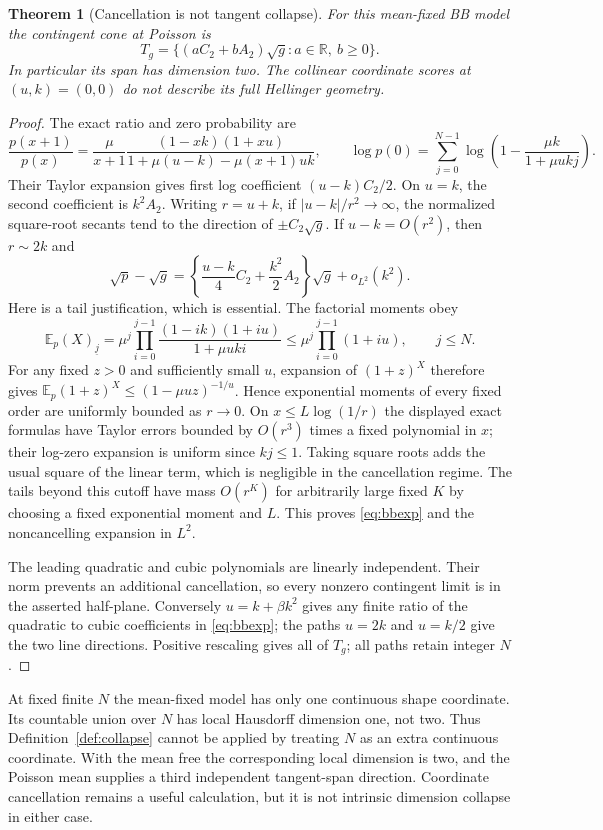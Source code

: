 \documentclass[11pt]{article}
\newcommand{\E}{\mathbb E}
\newtheorem{theorem}{Theorem}
\theoremstyle{definition}
\theoremstyle{remark}
\begin{document}
\begin{theorem}[Cancellation is not tangent collapse]\label{th:bb}
For this mean-fixed BB model the contingent cone at Poisson is
\[
 T_g=\{(a C_2+b A_2)\sqrt g:a\in\mathbb R,\ b\ge0\}.
\]
In particular its span has dimension two. The collinear coordinate scores
at $(u,k)=(0,0)$ do not describe its full Hellinger geometry.
\end{theorem}
\begin{proof}
The exact ratio and zero probability are
\[
 \frac{p(x+1)}{p(x)}=\frac{\mu}{x+1}
 \frac{(1-xk)(1+xu)}{1+\mu(u-k)-\mu(x+1)uk},\qquad
 \log p(0)=\sum_{j=0}^{N-1}\log\left(1-\frac{\mu k}{1+\mu ukj}\right).
\]
Their Taylor expansion gives first log coefficient $(u-k)C_2/2$.
On $u=k$, the second coefficient is $k^2 A_2$.
Writing $r=u+k$, if $|u-k|/r^2\to\infty$, the normalized square-root
secants tend to the direction of $\pm C_2\sqrt g$. If $u-k=O(r^2)$,
then $r\sim2k$ and
\begin{equation}\label{eq:bbexp}
 \sqrt p-\sqrt g=
 \left\{\frac{u-k}{4}C_2+\frac{k^2}{2}A_2\right\}\sqrt g+o_{L^2}(k^2).
\end{equation}
Here is a tail justification, which is essential. The factorial moments obey
\[
 \E_p(X)_{\underline j}
 =\mu^j\prod_{i=0}^{j-1}\frac{(1-ik)(1+iu)}{1+\mu uki}
 \le\mu^j\prod_{i=0}^{j-1}(1+iu),\qquad j\le N.
\]
For any fixed $z>0$ and sufficiently small $u$, expansion of
$(1+z)^X$ therefore gives
$\E_p(1+z)^X\le(1-\mu uz)^{-1/u}$. Hence exponential moments of every
fixed order are uniformly bounded as $r\to0$. On
$x\le L\log(1/r)$ the displayed exact formulas have Taylor errors bounded
by $O(r^3)$ times a fixed polynomial in $x$; their log-zero expansion is
uniform since $kj\le1$. Taking square roots adds the usual square of the
linear term, which is negligible in the cancellation regime. The tails
beyond this cutoff have mass $O(r^K)$ for arbitrarily large fixed $K$ by
choosing a fixed exponential moment and $L$. This proves \eqref{eq:bbexp}
and the noncancelling expansion in $L^2$.

The leading quadratic and cubic polynomials are linearly independent. Their
norm prevents an additional cancellation, so every nonzero contingent limit
is in the asserted half-plane. Conversely $u=k+\beta k^2$ gives any finite
ratio of the quadratic to cubic coefficients in \eqref{eq:bbexp}; the paths
$u=2k$ and $u=k/2$ give the two line directions. Positive rescaling gives
all of $T_g$; all paths retain integer $N$.
\end{proof}
At fixed finite $N$ the mean-fixed model has only one continuous shape
coordinate. Its countable union over $N$ has local Hausdorff dimension one,
not two. Thus Definition~\ref{def:collapse} cannot be applied by treating
$N$ as an extra continuous coordinate. With the mean free the corresponding
local dimension is two, and the Poisson mean supplies a third independent
tangent-span direction. Coordinate cancellation remains a useful calculation,
but it is not intrinsic dimension collapse in either case.
\end{document}
